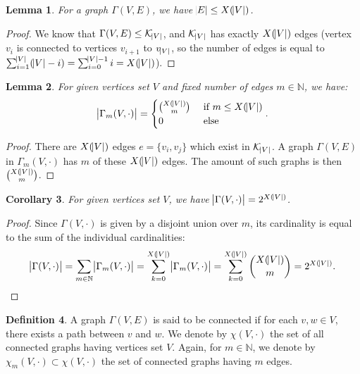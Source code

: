 \documentclass{article}
\newtheorem{lemma}{Lemma}[section]
\newtheorem{corollary}[lemma]{Corollary}
\theoremstyle{definition}
\newtheorem{definition}[lemma]{Definition}
\theoremstyle{remark}
\newcommand{\N}{\mathbb N}
\begin{document}
		\begin{lemma} For a graph $\Gamma(V, E)$, we have $\abs E \leq X(\abs V)$.
		\end{lemma}

		\begin{proof} We know that $\Gamma(V, E) \leq \mathcal K_{\abs V}$, and $\mathcal K_{\abs V}$ has exactly $X(\abs V)$ edges (vertex $v_i$ is connected
		to vertices $v_{i+1}$ to $v_{\abs V}$, so the number of edges is equal to $\sum_{i=1}^{\abs V}(\abs V - i) = \sum_{i=0}^{\abs V - 1}i = X(\abs V)$).
		\end{proof}

		\begin{lemma} For given vertices set $V$ and fixed number of edges $m \in \N$, we have:
		\[\abs {\Gamma_m(V, \cdot)} = \begin{cases}\binom {X(\abs V)}m &\text{ if } m \leq X(\abs V) \\0 &\text{ else}\end{cases}.\]
		\end{lemma}

		\begin{proof} There are $X(\abs V)$ edges $e = \{v_i, v_j\}$ which exist in $\mathcal K_{\abs V}$. A graph $\Gamma(V, E)$ in $\Gamma_m(V, \cdot)$
		has $m$ of these $X(\abs V)$ edges. The amount of such graphs is then $\binom {X(\abs V)}m$.
		\end{proof}

		\begin{corollary} For given vertices set $V$, we have $\abs {\Gamma(V, \cdot)} = 2^{X(\abs V)}$.
		\end{corollary}

		\begin{proof} Since $\Gamma(V, \cdot)$ is given by a disjoint union over $m$, its cardinality is equal to the sum of the individual cardinalities:
		\[\abs {\Gamma(V, \cdot)} = \sum_{m \in \N}\abs {\Gamma_m(V, \cdot)} = \sum_{k=0}^{X(\abs V)}\abs {\Gamma_m(V, \cdot)}
			= \sum_{k=0}^{X(\abs V)}\binom {X(\abs V)}m = 2^{X(\abs V)}.\]
		\end{proof}

		\begin{definition} A graph $\Gamma(V, E)$ is said to be connected if for each $v, w \in V$, there exists a path between $v$ and $w$. We denote by $\chi(V, \cdot)$ the
		set of all connected graphs having vertices set $V$. Again, for $m \in \N$, we denote by $\chi_m(V, \cdot) \subset \chi(V, \cdot)$ the set of connected graphs having $m$ edges.
		\end{definition}
\end{document}

